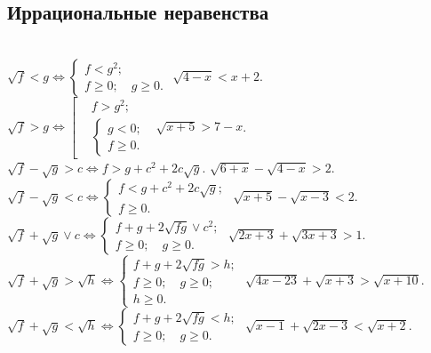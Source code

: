 \subsection*{Иррациональные неравенства}

\begin{tabbing}
\hspace{20em}\=\\[-4ex]
\(
    \sqrt{f} < g
\Leftrightarrow
    \begin{cases}
        f < g^2
    ;\\
        f \geq 0
    ;\quad
        g \geq 0
    .\end{cases}
\)
\>
\problem
$\sqrt{4 - x} < x + 2$.
\\[2ex]%
\(
    \sqrt{f} > g
\Leftrightarrow
    \left[\begin{aligned}
        &f > g^2
    ;\\
        &\begin{cases}
            g < 0
        ;\\
            f \geq 0
        .\end{cases}
    \end{aligned}\right.
\)
\>
\problem
$\sqrt{x + 5} > 7 - x$.
\\[2ex]%
\(
    \sqrt{f} - \sqrt{g} > c
\Leftrightarrow
    f > g + c^2 + 2 c \sqrt{g}
\).
\>
\problem
$\sqrt{6 + x} - \sqrt{4 - x} > 2$.
\\[2ex]%
\(
    \sqrt{f} - \sqrt{g} < c
\Leftrightarrow
    \begin{cases}
        f < g + c^2 + 2 c \sqrt{g}
    ;\\
        f \geq 0
    .\end{cases}
\)
\>
\problem
$\sqrt{x + 5} - \sqrt{x - 3} < 2$.
\\[2ex]%
\(
    \sqrt{f} + \sqrt{g} \vee c
\Leftrightarrow
    \begin{cases}
        f + g + 2 \sqrt{f g} \vee c^2
    ;\\
        f \geq 0
    ;\quad
        g \geq 0
    .\end{cases}
\)
\>
\problem
$\sqrt{2 x + 3} + \sqrt{3 x + 3} > 1$.
\\[2ex]%
\(
    \sqrt{f} + \sqrt{g} > \sqrt{h}
\Leftrightarrow
    \begin{cases}
        f + g + 2 \sqrt{f g} > h
    ;\\
        f \geq 0
    ;\quad
        g \geq 0
    ;\\
        h \geq 0
    .\end{cases}
\)
\>
\problem
$\sqrt{4 x - 23} + \sqrt{x + 3} > \sqrt{x + 10}$.
\\[2ex]%
\(
    \sqrt{f} + \sqrt{g} < \sqrt{h}
\Leftrightarrow
    \begin{cases}
        f + g + 2 \sqrt{f g} < h
    ;\\
        f \geq 0
    ;\quad
        g \geq 0
    .\end{cases}
\)
\>
\problem
$\sqrt{x - 1} + \sqrt{2 x - 3} < \sqrt{x + 2}$.
\end{tabbing}


